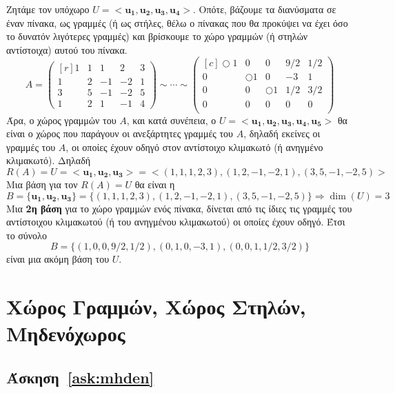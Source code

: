 Ζητάμε τον υπόχωρο $ U = < \mathbf{u_{1}}, \mathbf{u_{2}}, \mathbf{u_{3}},
\mathbf{u_{4}} >  $. Οπότε, βάζουμε τα διανύσματα σε έναν πίνακα, ως γραμμές 
(ή ως στήλες, θέλω ο πίνακας που θα προκύψει να έχει όσο το δυνατόν λιγότερες γραμμές) 
και βρίσκουμε το χώρο γραμμών (ή στηλών αντίστοιχα) αυτού του πίνακα. 
\[
  A = \begin{pmatrix*}[r]
    1 & 1 & 1 & 2 & 3 \\
    1 & 2 & -1 & -2 & 1 \\
    3 & 5 & -1 & -2 & 5 \\
    1 & 2 & 1 & -1 & 4
  \end{pmatrix*} \sim \cdots \sim
  \begin{pmatrix*}[c]
    \Circle{1} & 0 & 0 & 9/2 & 1/2 \\
    0 & \Circle{1} & 0 & -3 & 1 \\
    0 & 0 & \Circle{1} & 1/2 & 3/2 \\
    0 & 0 & 0 & 0 & 0 \\
  \end{pmatrix*}
\] 
Άρα, ο χώρος γραμμών του $A$, και κατά συνέπεια, ο 
$ U = < \mathbf{u_{1}}, \mathbf{u_{2}}, \mathbf{u_{3}}, \mathbf{u_{4}}, 
\mathbf{u_{5}} >  $ θα είναι ο χώρος που παράγουν οι ανεξάρτητες γραμμές του $A$, 
δηλαδή εκείνες οι γραμμές του $A$, οι οποίες έχουν οδηγό στον αντίστοιχο κλιμακωτό (ή
ανηγμένο κλιμακωτό). Δηλαδή
\[
  R(A) = U = < \mathbf{u_{1}}, \mathbf{u_{2}}, \mathbf{u_{3}} > = 
  < (1,1,1,2,3), (1,2,-1,-2,1),(3,5,-1,-2,5) >  
\] 
Μια βάση για τον $ R(A) = U $ θα είναι η 
\[
  B = \{ \mathbf{u_{1}}, \mathbf{u_{2}}, \mathbf{u_{3}} \} = 
  \{  (1,1,1,2,3), (1,2,-1,-2,1),(3,5,-1,-2,5)  \} \Rightarrow 
  \dim(U) = 3
\]
Μια \textbf{2η βάση} για το χώρο γραμμών ενός πίνακα, δίνεται από τις
\textcolor{Col1}{ίδιες} τις γραμμές του αντίστοιχου κλιμακωτού 
(ή του ανηγμένου κλιμακωτού) οι οποίες έχουν οδηγό.  Έτσι το σύνολο 
\[
  B = \{ (1,0,0,9/2,1/2), (0,1,0,-3,1), (0,0,1,1/2,3/2)\}  
\] 
είναι μια ακόμη βάση του $U$.

\section*{Χώρος Γραμμών, Χώρος Στηλών, Μηδενόχωρος}

\subsection*{Άσκηση~\ref{ask:mhden}}

